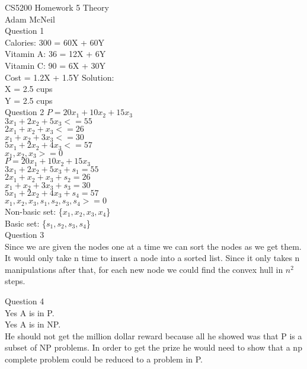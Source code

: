 \documentclass{article}
\begin{document}
CS5200 Homework 5 Theory \\
Adam McNeil \\
Question 1 \\
Calories: 300 = 60X + 60Y \\
Vitamin A: 36 = 12X + 6Y \\ 
Vitamin C: 90 = 6X + 30Y \\
Cost = 1.2X + 1.5Y
Solution:\\
X = 2.5 cups\\
Y = 2.5 cups\\

Question 2
${P = 20x_1 + 10x_2 + 15x_3}$ \\
${     3x_1 +  2x_2 +  5x_3 <= 55}$\\
${     2x_1 +   x_2 +   x_3 <= 26}$\\
${      x_1 +   x_2 +  3x_3 <= 30}$\\
${     5x_1 +  2x_2 +  4x_3 <= 57}$\\
${      x_1 ,   x_2 ,   x_3 >=  0}$\\


${P = 20x_1 + 10x_2 + 15x_3}$ \\
${     3x_1 +  2x_2 +  5x_3 + s_1 = 55}$\\
${     2x_1 +   x_2 +   x_3 + s_2 = 26}$\\
${      x_1 +   x_2 +  3x_3 + s_3 = 30}$\\
${     5x_1 +  2x_2 +  4x_3 + s_4 = 57}$\\
${      x_1 ,   x_2 ,   x_3, s_1, s_2, s_3, s_4 >=  0}$\\

Non-basic set: \{${x_1, x_2, x_3, x_4}$\}\\
Basic set: \{${s_1, s_2, s_3, s_4}$\}\\

Question 3\\
Since we are given the nodes one at a time we can sort the nodes as we get them. 
It would only take n time to insert a node into a sorted list.
Since it only takes n manipulations after that, for each new node we could find the convex hull in ${n^2}$ steps.

Question 4\\
Yes A is in P.\\
Yes A is in NP.\\
He should not get the million dollar reward because all he showed was that P is a subset of NP problems.
In order to get the prize he would need to show that a np complete problem could be reduced to a problem in P.\\
\end{document}
